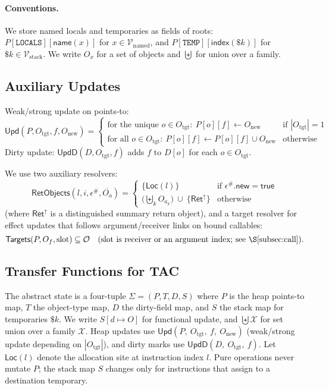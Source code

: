 \paragraph{Conventions.}
We store named locals and temporaries as fields of roots:
\(P[\mathtt{LOCALS}][\mathsf{name}(x)]\) for \(x\in\mathcal{V}_{\mathrm{named}}\),
and \(P[\mathtt{TEMP}][\mathsf{index}(\$k)]\) for \(\$k\in\mathcal{V}_{\mathrm{stack}}\).
We write \(O_x\) for a set of objects and \(\biguplus\) for union over a family.

\subsection{Auxiliary Updates}

Weak/strong update on points-to:
\[
\mathsf{Upd}(P,O_{\mathrm{tgt}},f,O_{\mathrm{new}})=
\begin{cases}
\text{for the unique }o\in O_{\mathrm{tgt}}:~P[o][f]\leftarrow O_{\mathrm{new}} & \text{if }|O_{\mathrm{tgt}}|=1\\
\text{for all }o\in O_{\mathrm{tgt}}:~P[o][f]\leftarrow P[o][f]\cup O_{\mathrm{new}} & \text{otherwise}
\end{cases}
\]
Dirty update: \(\mathsf{UpdD}(D,O_{\mathrm{tgt}},f)\) adds \(f\) to \(D[o]\) for each \(o\in O_{\mathrm{tgt}}\).

\smallskip
We use two auxiliary resolvers:
\[
\mathsf{RetObjects}(l,i,\epsilon^\#,\overline{O_a}) =
\begin{cases}
\{\mathsf{Loc}(l)\} & \text{if }\epsilon^\#.\mathsf{new}=\mathsf{true}\\
\Big(\biguplus_k O_{a_k}\Big)\ \cup\ \{\mathsf{Ret}^\uparrow\} & \text{otherwise}
\end{cases}
\]
(where \(\mathsf{Ret}^\uparrow\) is a distinguished summary return object),
and a target resolver for effect updates that follows argument/receiver links on bound callables:
\[
\mathsf{Targets}(P, O_f, \text{slot}) \subseteq \mathcal{O}
\quad\text{(slot is receiver or an argument index; see \S\ref{subsec:call})}.
\]

\subsection{Transfer Functions for TAC}
\label{subsec:transfers}

The abstract state is a four-tuple \(\Sigma = (P,T,D,S)\) where \(P\) is the heap
points-to map, \(T\) the object-type map, \(D\) the dirty-field map, and \(S\) the
stack map for temporaries \(\$k\).
We write \(S[d \mapsto O]\) for functional update, and
\(\biguplus\mathcal{X}\) for set union over a family \(\mathcal{X}\).
Heap updates use
\(\mathsf{Upd}(P,\ O_{\mathrm{tgt}},\ f,\ O_{\mathrm{new}})\)
(weak/strong update depending on \(|O_{\mathrm{tgt}}|\)),
and dirty marks use
\(\mathsf{UpdD}(D,\ O_{\mathrm{tgt}},\ f)\).
Let \(\mathsf{Loc}(l)\) denote the allocation site at instruction index \(l\).
Pure operations never mutate \(P\); the stack map \(S\) changes only for
instructions that assign to a destination temporary.

